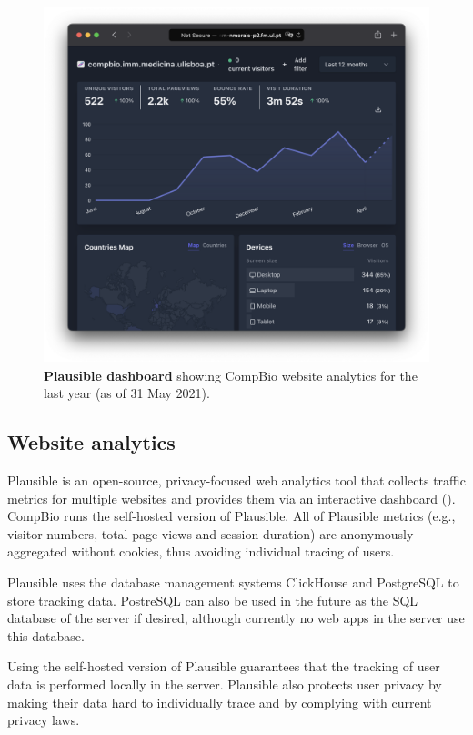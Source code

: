 \begin{figure}
  \includegraphics[width=\linewidth]{images/app-server/plausible}
  \caption[Plausible dashboard]{\textbf{Plausible dashboard} showing CompBio website analytics for the last year (as of 31 May 2021).}
  \label{fig:plausible}
\end{figure}

\subsection{Website analytics}

Plausible is an open-source, privacy-focused web analytics tool that collects traffic metrics for multiple websites and provides them via an interactive dashboard (). CompBio runs the self-hosted version of Plausible. All of Plausible metrics (e.g., visitor numbers, total page views and session duration) are anonymously aggregated without cookies, thus avoiding individual tracing of users.

Plausible uses the database management systems ClickHouse and PostgreSQL to store tracking data. PostreSQL can also be used in the future as the SQL database of the server if desired, although currently no web apps in the server use this database.

Using the self-hosted version of Plausible guarantees that the tracking of user data is performed locally in the server. Plausible also protects user privacy by making their data hard to individually trace and by complying with current privacy laws. %

